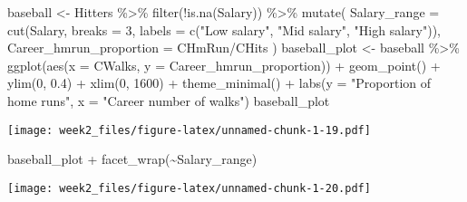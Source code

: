 \documentclass[
]{article}
\newenvironment{Shaded}{\begin{snugshade}}{\end{snugshade}}
\newcommand{\AttributeTok}[1]{\textcolor[rgb]{0.77,0.63,0.00}{#1}}
\newcommand{\DecValTok}[1]{\textcolor[rgb]{0.00,0.00,0.81}{#1}}
\newcommand{\FloatTok}[1]{\textcolor[rgb]{0.00,0.00,0.81}{#1}}
\newcommand{\FunctionTok}[1]{\textcolor[rgb]{0.00,0.00,0.00}{#1}}
\newcommand{\NormalTok}[1]{#1}
\newcommand{\OtherTok}[1]{\textcolor[rgb]{0.56,0.35,0.01}{#1}}
\newcommand{\SpecialCharTok}[1]{\textcolor[rgb]{0.00,0.00,0.00}{#1}}
\newcommand{\StringTok}[1]{\textcolor[rgb]{0.31,0.60,0.02}{#1}}
\begin{document}
\begin{Shaded}
\begin{Highlighting}[]
\NormalTok{  baseball }\OtherTok{\textless{}{-}}\NormalTok{ Hitters }\SpecialCharTok{\%\textgreater{}\%}  \FunctionTok{filter}\NormalTok{(}\SpecialCharTok{!}\FunctionTok{is.na}\NormalTok{(Salary)) }\SpecialCharTok{\%\textgreater{}\%}  \FunctionTok{mutate}\NormalTok{( }\AttributeTok{Salary\_range =} \FunctionTok{cut}\NormalTok{(Salary, }\AttributeTok{breaks =} \DecValTok{3}\NormalTok{,  }\AttributeTok{labels =} \FunctionTok{c}\NormalTok{(}\StringTok{"Low salary"}\NormalTok{, }\StringTok{"Mid salary"}\NormalTok{, }\StringTok{"High salary"}\NormalTok{)), }\AttributeTok{Career\_hmrun\_proportion =}\NormalTok{ CHmRun}\SpecialCharTok{/}\NormalTok{CHits )}
\NormalTok{  baseball\_plot }\OtherTok{\textless{}{-}}\NormalTok{   baseball }\SpecialCharTok{\%\textgreater{}\%} 
    \FunctionTok{ggplot}\NormalTok{(}\FunctionTok{aes}\NormalTok{(}\AttributeTok{x =}\NormalTok{ CWalks, }\AttributeTok{y =}\NormalTok{ Career\_hmrun\_proportion)) }\SpecialCharTok{+} \FunctionTok{geom\_point}\NormalTok{() }\SpecialCharTok{+} \FunctionTok{ylim}\NormalTok{(}\DecValTok{0}\NormalTok{, }\FloatTok{0.4}\NormalTok{) }\SpecialCharTok{+} \FunctionTok{xlim}\NormalTok{(}\DecValTok{0}\NormalTok{, }\DecValTok{1600}\NormalTok{) }\SpecialCharTok{+} \FunctionTok{theme\_minimal}\NormalTok{() }\SpecialCharTok{+} \FunctionTok{labs}\NormalTok{(}\AttributeTok{y =} \StringTok{"Proportion of home runs"}\NormalTok{,}
         \AttributeTok{x =} \StringTok{"Career number of walks"}\NormalTok{)  }
\NormalTok{  baseball\_plot}
\end{Highlighting}
\end{Shaded}

\texttt{[image: week2\_files/figure-latex/unnamed-chunk-1-19.pdf]}

\begin{Shaded}
\begin{Highlighting}[]
\NormalTok{  baseball\_plot }\SpecialCharTok{+} \FunctionTok{facet\_wrap}\NormalTok{(}\SpecialCharTok{\textasciitilde{}}\NormalTok{Salary\_range)}
\end{Highlighting}
\end{Shaded}

\texttt{[image: week2\_files/figure-latex/unnamed-chunk-1-20.pdf]}
\end{document}
